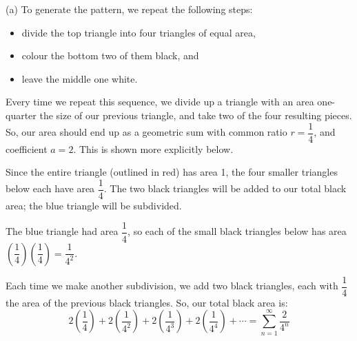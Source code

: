 \begin{solution}
(a)
To generate the pattern, we repeat the following steps:
\begin{itemize}
\item divide the top triangle into four triangles of equal area,
\item colour the bottom two of them black, and
\item leave the middle one white.
\end{itemize}
Every time we repeat this sequence, we divide up a triangle with an area one-quarter the size of our previous triangle, and take two of the four resulting pieces. So, our area should end up as a geometric sum with common ratio $r=\dfrac14$, and coefficient $a=2$. This is shown more explicitly below.

Since the entire triangle (outlined in red) has area 1, the four smaller triangles below each have area $\dfrac14$. The two black triangles will be added to our total black area; the blue triangle will be subdivided.
\begin{center}
\end{center}

The blue triangle had area $\dfrac{1}{4}$, so each of the small black triangles below has area $\left(\dfrac14\right)\left(\dfrac14\right)=\dfrac{1}{4^2}$.

\begin{center}
\end{center}
Each time we make another subdivision, we add two black triangles, each with $\dfrac{1}{4}$ the area of the previous black triangles. So, our total black area is:
\[2\left(\frac14\right)+2\left(\frac{1}{4^2}\right)+2\left(\frac{1}{4^3}\right)+2\left(\frac{1}{4^4}\right)+\cdots = \sum_{n=1}^\infty \frac{2}{4^n}\]


\end{solution}
